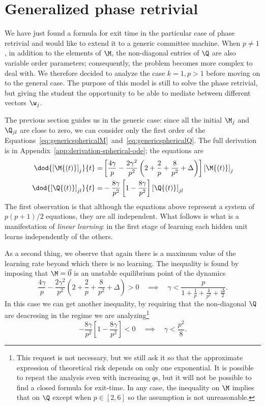 \section{Generalized phase retrivial} %
We have just found a formula for exit time in the particular case of phase retrivial and would like to extend it to a generic committee machine.
When \(p\neq1\), in addition to the elements of \(\M\), the non-diagonal entries of \(\Q\) are also variable order parameters;
consequently, the problem becomes more complex to deal with.
We therefore decided to analyze the case \(k=1,p>1\) before moving on to the general case.
The purpose of this model is still to solve the phase retrivial,
but giving the student the opportunity to be able to mediate between different vectors \(\w_j\).

The previous section guides us in the generic case: since all the initial \(\M_j\) and \(\Q_{jl}\) are close to zero,
we can consider only the first order of the Equations~\eqref{eq:genericsphericalM}~and~\eqref{eq:genericsphericalQ}.
The full derivation is in Appendix~\ref{app:derivation-spherical-ode}; the equations are
\begin{subequations}\label{eq:genericsphericalphaseretrivial}\begin{align}
  \dod{\left[\M{\left(t\right)}\right]_{j}}{t} =&
    \left[
      \frac{4 \gamma}{p} -\frac{2 \gamma^2}{p^2} \left(2 +\frac{2}{p} + \frac{8}{p^2} + \Delta \right)
    \right] \left[\M{\left(t\right)}\right]_{j} \\
  \dod{\left[\Q{\left(t\right)}\right]_{jl}}{t} =&
   -\frac{8 \gamma}{p^2} \left[1-\frac{8\gamma}{p^2}\right] \left[\Q{\left(t\right)}\right]_{jl}
\end{align}\end{subequations}
The first observation is that although the equations above represent a system of \(p(p+1)/2\) equations,
they are all independent. What follows is what is a manifestation of \emph{linear learning}: 
in the first stage of learning each hidden unit learns independently of the others.

As a second thing, we observe that again there is a maximum value of the learning rate beyond which there is no learning.
The inequality is found by imposing that \(\M=\vec{0}\) is an unstable equilibrium point of the dynamics
\[
  \frac{4 \gamma}{p} -\frac{2 \gamma^2}{p^2} \left(2 +\frac{2}{p} + \frac{8}{p^2} + \Delta \right) > 0 \quad \implies\quad
  \gamma < \frac{p}{1 +\frac{1}{p} + \frac{4}{p^2} + \frac\Delta2}.
\]
In this case we can get another inequality, by requiring that the non-diagonal \(\Q\) are deacresing in the regime we are analyzing\footnote{
  This request is not necessary, but we still ask it so that the approximate expression of theoretical risk depends on only one exponential.
  It is possible to repeat the analysis even with increasing \(q\)s, but it will not be possible to find a closed formula for exit-time.
  In any case, the inequality on \(\M\) implies that on \(\Q\) except when \(p\in[2,6]\) so the assumption is not unreasonable.
}
\[
  -\frac{8 \gamma}{p^2} \left[1-\frac{8\gamma}{p^2}\right] < 0 \quad \implies\quad
  \gamma < \frac{p^2}{8}.
\]

